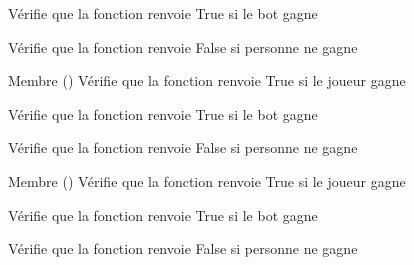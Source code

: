 \begin{DoxyRefList}
Vérifie que la fonction renvoie True si le bot gagne 



Vérifie que la fonction renvoie False si personne ne gagne  
\item[Membre \doxylink{namespacetests_1_1test__puissanceQuatre_aa89c818c86b6e6e098a319831f94b59b}{tests.test\+\_\+puissance\+Quatre.tp\+\_\+victoire\+\_\+diago} ()]\label{test__test000006}%
%
Vérifie que la fonction renvoie True si le joueur gagne 



Vérifie que la fonction renvoie True si le bot gagne 



Vérifie que la fonction renvoie False si personne ne gagne  
\item[Membre \doxylink{namespacetests_1_1test__puissanceQuatre_ad37eb17f066165700d2e876bdf1f1036}{tests.test\+\_\+puissance\+Quatre.tp\+\_\+victoire\+\_\+ligne} ()]\label{test__test000004}%
%
Vérifie que la fonction renvoie True si le joueur gagne 



Vérifie que la fonction renvoie True si le bot gagne 



Vérifie que la fonction renvoie False si personne ne gagne 
\end{DoxyRefList}